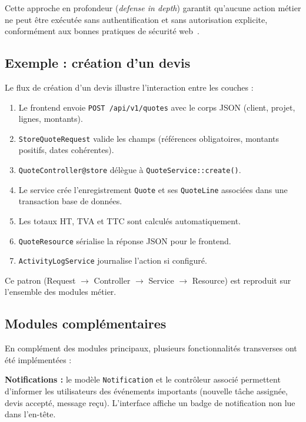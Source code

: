 Cette approche en profondeur (\textit{defense in depth}) garantit qu'aucune action
métier ne peut être exécutée sans authentification et sans autorisation explicite,
conformément aux bonnes pratiques de sécurité web~\cite{owasp}.

\subsection{Exemple : création d'un devis}

Le flux de création d'un devis illustre l'interaction entre les couches :

\begin{enumerate}
  \item Le frontend envoie \texttt{POST /api/v1/quotes} avec le corps JSON
  (client, projet, lignes, montants).
  \item \texttt{StoreQuoteRequest} valide les champs (références obligatoires,
  montants positifs, dates cohérentes).
  \item \texttt{QuoteController@store} délègue à \texttt{QuoteService::create()}.
  \item Le service crée l'enregistrement \texttt{Quote} et ses \texttt{QuoteLine}
  associées dans une transaction base de données.
  \item Les totaux HT, TVA et TTC sont calculés automatiquement.
  \item \texttt{QuoteResource} sérialise la réponse JSON pour le frontend.
  \item \texttt{ActivityLogService} journalise l'action si configuré.
\end{enumerate}

Ce patron (Request $\rightarrow$ Controller $\rightarrow$ Service $\rightarrow$
Resource) est reproduit sur l'ensemble des modules métier.

\subsection{Modules complémentaires}

En complément des modules principaux, plusieurs fonctionnalités transverses ont été
implémentées :

\medskip

\textbf{Notifications :} le modèle \texttt{Notification} et le contrôleur associé
permettent d'informer les utilisateurs des événements importants (nouvelle tâche
assignée, devis accepté, message reçu). L'interface affiche un badge de notification
non lue dans l'en-tête.

